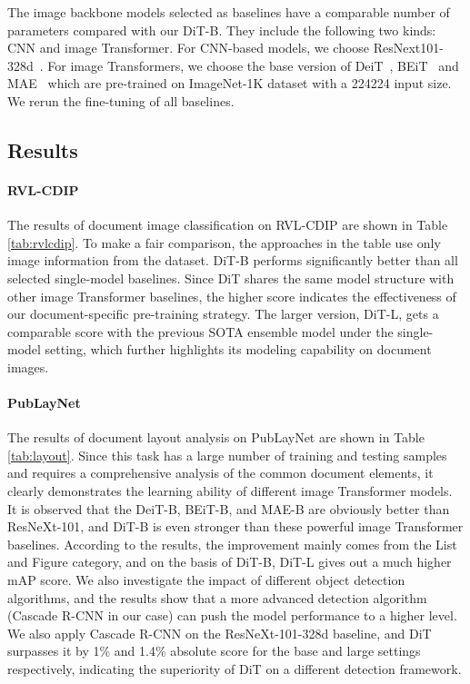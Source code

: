 \documentclass[sigconf]{acmart}
\begin{document}
The image backbone models selected as baselines have a comparable number of parameters compared with our DiT-B. They include the following two kinds: CNN and image Transformer. For CNN-based models, we choose ResNext101-328d~\citep{Xie2016AggregatedRT}. For image Transformers, we choose the base version of DeiT~\citep{touvron2020deit}, BEiT~\citep{bao2021beit} and MAE~\citep{he2021masked} which are pre-trained on ImageNet-1K dataset with a 224224 input size. We rerun the fine-tuning of all baselines. 







 

\subsection{Results}

\paragraph{RVL-CDIP}
The results of document image classification on RVL-CDIP are shown in Table \ref{tab:rvlcdip}. To make a fair comparison, the approaches in the table use only image information from the dataset. DiT-B performs significantly better than all selected single-model baselines. Since DiT shares the same model structure with other image Transformer baselines, the higher score indicates the effectiveness of our document-specific pre-training strategy. The larger version, DiT-L, gets a comparable score with the previous SOTA ensemble model under the single-model setting, which further highlights its modeling capability on document images. 




\paragraph{PubLayNet}
The results of document layout analysis on PubLayNet are shown in Table \ref{tab:layout}. Since this task has a large number of training and testing samples and requires a comprehensive analysis of the common document elements, it clearly demonstrates the learning ability of different image Transformer models. It is observed that the DeiT-B, BEiT-B, and MAE-B are obviously better than ResNeXt-101, and DiT-B is even stronger than these powerful image Transformer baselines. According to the results, the improvement mainly comes from the List and Figure category, and on the basis of DiT-B, DiT-L gives out a much higher mAP score. We also investigate the impact of different object detection algorithms, and the results show that a more advanced detection algorithm (Cascade R-CNN in our case) can push the model performance to a higher level. We also apply Cascade R-CNN on the ResNeXt-101-328d baseline, and DiT surpasses it by 1\% and 1.4\% absolute score for the base and large settings respectively, indicating the superiority of DiT on a different detection framework.
\end{document}
